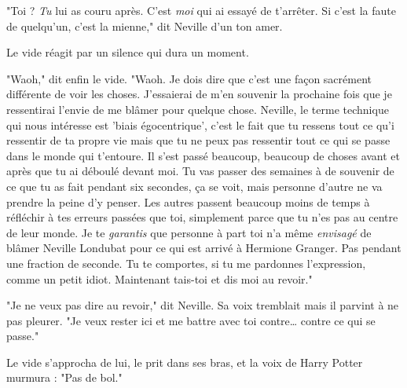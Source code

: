 "Toi ? \emph{Tu}  lui as couru après. C'est \emph{moi}  qui ai essayé de t'arrêter. Si c'est la faute de quelqu'un, c'est la mienne," dit Neville d'un ton amer.

Le vide réagit par un silence qui dura un moment.

"Waoh," dit enfin le vide. "Waoh. Je dois dire que c'est une façon sacrément différente de voir les choses. J'essaierai de m'en souvenir la prochaine fois que je ressentirai l'envie de me blâmer pour quelque chose. Neville, le terme technique qui nous intéresse est 'biais égocentrique', c'est le fait que tu ressens tout ce qu'i ressentir de ta propre vie mais que tu ne peux pas ressentir tout ce qui se passe dans le monde qui t'entoure. Il s'est passé beaucoup, beaucoup de choses avant et après que tu ai déboulé devant moi. Tu vas passer des semaines à de souvenir de ce que tu as fait pendant six secondes, ça se voit, mais personne d'autre ne va prendre la peine d'y penser. Les autres passent beaucoup moins de temps à réfléchir à tes erreurs passées que toi, simplement parce que tu n'es pas au centre de leur monde. Je te \emph{garantis}  que personne à part toi n'a même \emph{envisagé}  de blâmer Neville Londubat pour ce qui est arrivé à Hermione Granger. Pas pendant une fraction de seconde. Tu te comportes, si tu me pardonnes l'expression, comme un petit idiot. Maintenant tais-toi et dis moi au revoir."

"Je ne veux pas dire au revoir," dit Neville. Sa voix tremblait mais il parvint à ne pas pleurer. "Je veux rester ici et me battre avec toi contre… contre ce qui se passe."

Le vide s'approcha de lui, le prit dans ses bras, et la voix de Harry Potter murmura : "Pas de bol."

